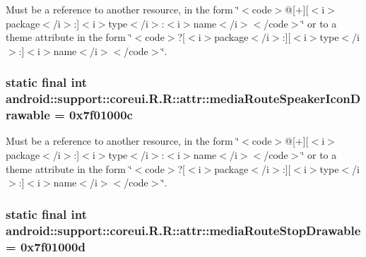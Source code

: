 Must be a reference to another resource, in the form \char`\"{}$<$code$>$@\mbox{[}+\mbox{]}\mbox{[}$<$i$>$package$<$/i$>$:\mbox{]}$<$i$>$type$<$/i$>$:$<$i$>$name$<$/i$>$$<$/code$>$\char`\"{} or to a theme attribute in the form \char`\"{}$<$code$>$?\mbox{[}$<$i$>$package$<$/i$>$:\mbox{]}\mbox{[}$<$i$>$type$<$/i$>$:\mbox{]}$<$i$>$name$<$/i$>$$<$/code$>$\char`\"{}. \hypertarget{classandroid_1_1support_1_1coreui_1_1_r_1_1attr_52fd1bd974a64e90462baa23b2d08eda}{
\subsubsection[{mediaRouteSpeakerIconDrawable}]{\setlength{\rightskip}{0pt plus 5cm}static final int android::support::coreui.R.R::attr::mediaRouteSpeakerIconDrawable = 0x7f01000c}}
\label{classandroid_1_1support_1_1coreui_1_1_r_1_1attr_52fd1bd974a64e90462baa23b2d08eda}


Must be a reference to another resource, in the form \char`\"{}$<$code$>$@\mbox{[}+\mbox{]}\mbox{[}$<$i$>$package$<$/i$>$:\mbox{]}$<$i$>$type$<$/i$>$:$<$i$>$name$<$/i$>$$<$/code$>$\char`\"{} or to a theme attribute in the form \char`\"{}$<$code$>$?\mbox{[}$<$i$>$package$<$/i$>$:\mbox{]}\mbox{[}$<$i$>$type$<$/i$>$:\mbox{]}$<$i$>$name$<$/i$>$$<$/code$>$\char`\"{}. \hypertarget{classandroid_1_1support_1_1coreui_1_1_r_1_1attr_8ca601c113cdb20c6188a81e49f0e3d6}{
\subsubsection[{mediaRouteStopDrawable}]{\setlength{\rightskip}{0pt plus 5cm}static final int android::support::coreui.R.R::attr::mediaRouteStopDrawable = 0x7f01000d}}
\label{classandroid_1_1support_1_1coreui_1_1_r_1_1attr_8ca601c113cdb20c6188a81e49f0e3d6}


